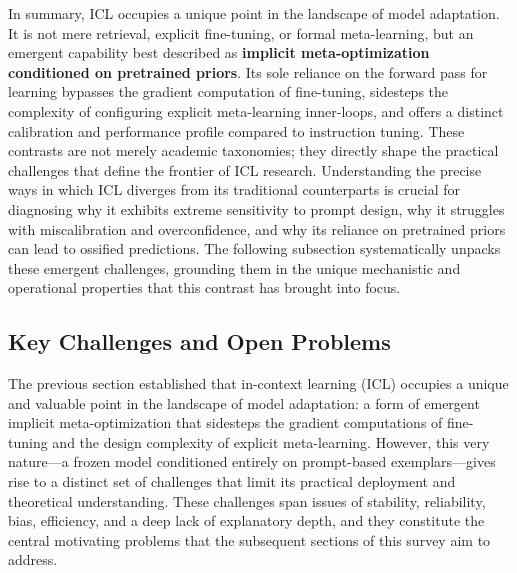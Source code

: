 \documentclass[11pt]{article}
\begin{document}
In summary, ICL occupies a unique point in the landscape of model adaptation. It is not mere retrieval, explicit fine-tuning, or formal meta-learning, but an emergent capability best described as \textbf{implicit meta-optimization conditioned on pretrained priors}. Its sole reliance on the forward pass for learning bypasses the gradient computation of fine-tuning, sidesteps the complexity of configuring explicit meta-learning inner-loops, and offers a distinct calibration and performance profile compared to instruction tuning. These contrasts are not merely academic taxonomies; they directly shape the practical challenges that define the frontier of ICL research. Understanding the precise ways in which ICL diverges from its traditional counterparts is crucial for diagnosing why it exhibits extreme sensitivity to prompt design, why it struggles with miscalibration and overconfidence, and why its reliance on pretrained priors can lead to ossified predictions. The following subsection systematically unpacks these emergent challenges, grounding them in the unique mechanistic and operational properties that this contrast has brought into focus.

\subsection{Key Challenges and Open Problems}

The previous section established that in-context learning (ICL) occupies a unique and valuable point in the landscape of model adaptation: a form of emergent implicit meta-optimization that sidesteps the gradient computations of fine-tuning and the design complexity of explicit meta-learning. However, this very nature---a frozen model conditioned entirely on prompt-based exemplars---gives rise to a distinct set of challenges that limit its practical deployment and theoretical understanding. These challenges span issues of stability, reliability, bias, efficiency, and a deep lack of explanatory depth, and they constitute the central motivating problems that the subsequent sections of this survey aim to address.
\end{document}
